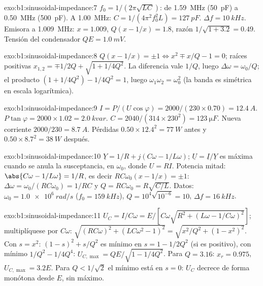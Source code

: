 \begin{solution}{exo:b1:sinusoidal-impedance:7}
$f_0 = 1/(2\pi\sqrt{LC})$: de \qty{1.59}{MHz} (\qty{50}{pF}) a \qty{0.50}{MHz}
(\qty{500}{pF}). A \qty{1.00}{MHz}: $C = 1/(4\pi^2f_0^2L) = \qty{127}{pF}$.
$\Delta f = \qty{10}{kHz}$. Emisora a \qty{1.009}{MHz}: $x = 1.009$,
$Q(x - 1/x) = 1.8$, razón $1/\sqrt{1 + 3.2} = 0.49$. Tensión del
condensador $QE = \qty{1.0}{mV}$.
\end{solution}

\begin{solution}{exo:b1:sinusoidal-impedance:8}
$Q(x - 1/x) = \pm1 \Leftrightarrow x^2 \mp x/Q - 1 = 0$; raíces positivas
$x_{1,2} = \mp 1/2Q + \sqrt{1 + 1/4Q^2}$. La diferencia vale $1/Q$, luego
$\Delta\omega = \omega_0/Q$; el producto $(1 + 1/4Q^2) - 1/4Q^2 = 1$, luego
$\omega_1\omega_2 = \omega_0^2$ (la banda es simétrica en escala logarítmica).
\end{solution}

\begin{solution}{exo:b1:sinusoidal-impedance:9}
$I = P/(U\cos\varphi) = 2000/(230 \times 0.70) = \qty{12.4}{A}$.  $P\tan\varphi = 2000 \times 1.02 = \qty{2.0}{kvar}$. $C = 2040/(314
\times 230^2) = \qty{123}{\micro F}$. Nueva corriente $2000/230 = \qty{8.7}{A}$.
Pérdidas $0.50 \times 12.4^2 = \qty{77}{W}$ antes y $0.50 \times 8.7^2 =
\qty{38}{W}$ después.
\end{solution}

\begin{solution}{exo:b1:sinusoidal-impedance:10}
$\underline Y = 1/R + j(C\omega - 1/L\omega)$; $\underline U = \underline I/
\underline Y$ es máxima cuando se anula la susceptancia, en $\omega_0$,
donde $U = RI$. Potencia mitad: $\abs{C\omega - 1/L\omega} = 1/R$, es decir
$RC\omega_0(x - 1/x) = \pm1$: $\Delta\omega = \omega_0/(RC\omega_0) = 1/RC$
y $Q = RC\omega_0 = R\sqrt{C/L}$. Datos: $\omega_0 = \qty{1.0e6}{rad/s}$
($f_0 = \qty{159}{kHz}$), $Q = 10^4\sqrt{10^{-6}} = 10$, $\Delta f =
\qty{16}{kHz}$.
\end{solution}

\begin{solution}{exo:b1:sinusoidal-impedance:11}
$U_C = I/C\omega = E/[C\omega\sqrt{R^2 + (L\omega - 1/C\omega)^2}]$;
multiplíquese por $C\omega$: $\sqrt{(RC\omega)^2 + (LC\omega^2 - 1)^2} =
\sqrt{x^2/Q^2 + (1 - x^2)^2}$. Con $s = x^2$: $(1 - s)^2 + s/Q^2$ es
mínimo en $s = 1 - 1/2Q^2$ (si es positivo), con mínimo $1/Q^2 - 1/4Q^4$:
$U_{C,\max} = QE/\sqrt{1 - 1/4Q^2}$. Para $Q = 3.16$: $x_r = 0.975$,
$U_{C,\max} = 3.2E$. Para $Q < 1/\sqrt2$ el mínimo está en $s = 0$: $U_C$
decrece de forma monótona desde $E$, sin máximo.
\end{solution}

